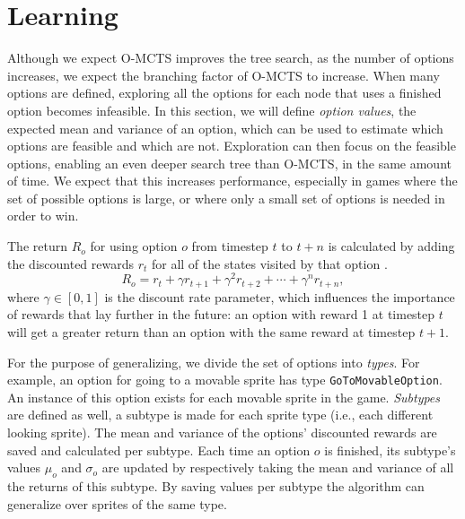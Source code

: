 \section{Learning} 
\label{sec:learning} 
Although we expect O-MCTS improves the tree search, as the number of options
increases, we expect the branching factor of O-MCTS to increase. When many
options are defined, exploring all the options for each node that uses a
finished option becomes infeasible. In this section, we will define \emph{option
values}, the expected mean and variance of an option, which can be used to
estimate which options are feasible and which are not. Exploration can then
focus on the feasible options, enabling an even deeper search tree than O-MCTS,
in the same amount of time. We expect that this increases performance,
especially in games where the set of possible options is large, or where only a
small set of options is needed in order to win.

The return $R_o$ for using option $o$ from timestep $t$ to $t+n$ is calculated
by adding the discounted rewards $r_t$ for all of the states visited by that
option \cite{sutton1999between}. $$R_o = r_{t} + \gamma r_{t+1} + \gamma^2 r_{t+2} + \cdots + \gamma^n
r_{t+n},$$ where $\gamma \in [0, 1]$ is the discount rate parameter, which
influences the importance of rewards that lay further in the future: an option
with reward 1 at timestep $t$ will get a greater return than an option with the
same reward at timestep $t+1$.  

For the purpose of generalizing, we divide the set of options into \emph{types}.
For example, an option for going to a movable sprite has type
\texttt{GoToMovableOption}. An instance of this option exists for each movable
sprite in the game. \emph{Subtypes} are defined as well, a subtype is made for
each sprite type (i.e., each different looking sprite). The mean and variance of
the options' discounted rewards are saved and calculated per subtype. Each time
an option $o$ is finished, its subtype's values $\mu_o$ and $\sigma_o$ are
updated by respectively taking the mean and variance of all the returns of this
subtype. By saving values per subtype the algorithm can generalize over sprites
of the same type.

